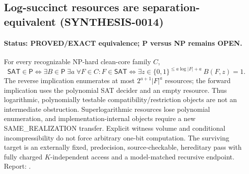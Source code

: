 \subsection{Log-succinct resources are separation-equivalent (SYNTHESIS-0014)}
\paragraph{Status: PROVED/EXACT equivalence; P versus NP remains OPEN.}
For every recognizable NP-hard clean-core family $C$,
\[
\mathsf{SAT}\in\mathsf P\iff
\exists B\in\mathsf P\;\exists a\;\forall F\in C:
F\in\mathsf{SAT}\iff\exists z\in\{0,1\}^{\le a\log |F|+a}\ B(F,z)=1.
\]
The reverse implication enumerates at most $2^{a+1}|F|^a$ resources; the forward implication uses the polynomial SAT decider and an empty resource.  Thus logarithmic, polynomially testable compatibility/restriction objects are not an intermediate obstruction.  Superlogarithmic resources lose polynomial enumeration, and implementation-internal objects require a new SAME\_REALIZATION transfer.  Explicit witness volume and conditional incompressibility do not force arbitrary one-bit computation.  The surviving target is an externally fixed, predecision, source-checkable, hereditary pass with fully charged $K$-independent access and a model-matched recursive endpoint.  Report: .
